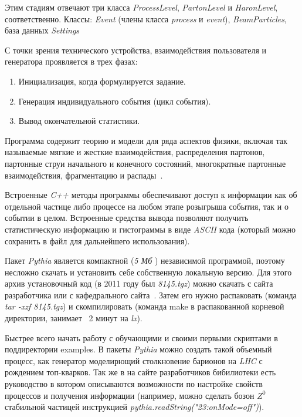 Этим стадиям отвечают три класса \textit{ProcessLevel},
\textit{PartonLevel} и \textit{HaronLevel}, соответственно. Классы: \textit{Event}
(члены класса \textit{process} и \textit{event}), \textit{BeamParticles}, база данных
\textit{Settings}

С точки зрения технического устройства,
взаимодействия пользователя и генератора проявляется в
трех фазах:


\begin{enumerate}
	\item Инициализация, когда формулируется задание.
	\item Генерация индивидуального события (цикл события).
	\item Вывод окончательной статистики.
\end{enumerate}

Программа содержит теорию и модели для ряда
аспектов физики, включая так называемые мягкие и жесткие
взаимодействия, распределения партонов, партонные струи
начального и конечного состояний, многократные
партонные взаимодействия, фрагментацию и распады~\cite{review-pythia}.

Встроенные \textit{C++} методы программы обеспечивают
доступ к информации как об отдельной частице либо
процессе на любом этапе розыгрыша события, так и о
событии в целом. Встроенные средства вывода позволяют
получить статистическую информацию и гистограммы в
виде \textit{ASCII} кода (который можно сохранить в файл для
дальнейшего использования).

Пакет \textit{Pythia} является компактной (\textit{5 Мб} )
независимой программой, поэтому несложно скачать и
установить себе собственную локальную версию. Для этого
архив установочный код (в 2011 году был \textit{8145.tgz}) можно
скачать с сайта разработчика или с кафедрального сайта~\cite{review-pythia}.
Затем его нужно распаковать (команда \textit{tar -xzf 8145.tgz})
и скомпилировать (команда make в распакованной корневой
директории, занимает ~2 минут на \textit{lx}).

Быстрее всего начать работу с обучающими и своими
первыми скриптами в поддиректории examples. В пакеты \textit{Pythia} можно создать такой объемный процесс, как генератор
моделирющий столкновение барионов на \textit{LHC} с рождением
топ-кварков. Так же в на сайте разработчиков бибилиотеки есть руководство в котором описываются возможности по настройке
свойств процессов и получения информации (например,
можно сделать бозон ${Z}^0$ стабильной частицей инструкцией \textit{pythia.readString("23:onMode=off")}). 


